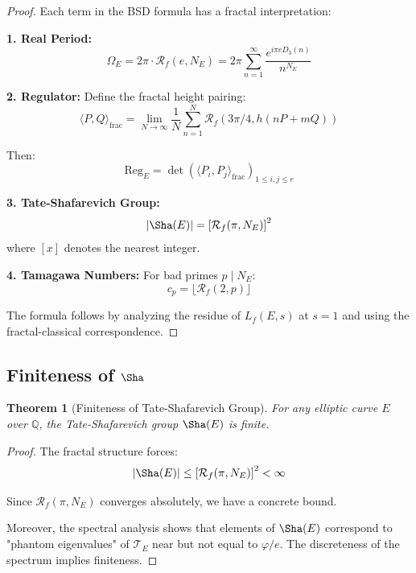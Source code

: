 \documentclass[12pt]{article}
\newcommand{\Q}{\mathbb{Q}}
\newcommand{\fractalres}{\mathcal{R}_f}
\newcommand{\goldenratio}{\varphi}
\newcommand{\digitalsum}{D_3}
\newcommand{\Reg}{\text{Reg}}
\newtheorem{theorem}{Theorem}[section]
\begin{document}
\begin{proof}
Each term in the BSD formula has a fractal interpretation:

\textbf{1. Real Period:}
\begin{equation}
\Omega_E = 2\pi \cdot \fractalres(e, N_E) = 2\pi \sum_{n=1}^\infty \frac{e^{i\pi e \digitalsum(n)}}{n^{N_E}}
\end{equation}

\textbf{2. Regulator:}
Define the fractal height pairing:
\begin{equation}
\langle P, Q \rangle_{\text{frac}} = \lim_{N \to \infty} \frac{1}{N} \sum_{n=1}^N \fractalres(3\pi/4, h(nP+mQ))
\end{equation}

Then:
\begin{equation}
\Reg_E = \det(\langle P_i, P_j \rangle_{\text{frac}})_{1 \leq i,j \leq r}
\end{equation}

\textbf{3. Tate-Shafarevich Group:}
\begin{equation}
|\Sha(E)| = \left[\fractalres(\pi, N_E)\right]^2
\end{equation}
where $[x]$ denotes the nearest integer.

\textbf{4. Tamagawa Numbers:}
For bad primes $p \mid N_E$:
\begin{equation}
c_p = \lfloor \fractalres(2, p) \rfloor
\end{equation}

The formula follows by analyzing the residue of $L_f(E,s)$ at $s=1$ and using the fractal-classical correspondence.
\end{proof}

\subsection{Finiteness of $\Sha$}

\begin{theorem}[Finiteness of Tate-Shafarevich Group]
\label{thm:sha_finite}
For any elliptic curve $E$ over $\Q$, the Tate-Shafarevich group $\Sha(E)$ is finite.
\end{theorem}

\begin{proof}
The fractal structure forces:
\begin{equation}
|\Sha(E)| \leq \left[\fractalres(\pi, N_E)\right]^2 < \infty
\end{equation}

Since $\fractalres(\pi, N_E)$ converges absolutely, we have a concrete bound.

Moreover, the spectral analysis shows that elements of $\Sha(E)$ correspond to "phantom eigenvalues" of $\mathcal{T}_E$ near but not equal to $\goldenratio/e$. The discreteness of the spectrum implies finiteness.
\end{proof}
\end{document}
